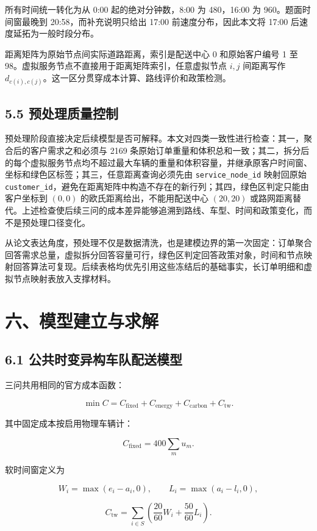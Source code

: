 \documentclass[UTF8,zihao=-4,a4paper]{ctexart}
\begin{document}
所有时间统一转化为从 0:00 起的绝对分钟数，8:00 为 480，16:00 为 960。题面时间窗最晚到 20:58，而补充说明只给出 17:00 前速度分布，因此本文将 17:00 后速度延拓为一般时段分布。

距离矩阵为原始节点间实际道路距离，索引是配送中心 0 和原始客户编号 1 至 98。虚拟服务节点不直接用于距离矩阵索引，任意虚拟节点 \(i,j\) 间距离写作 \(d_{c(i),c(j)}\)。这一区分贯穿成本计算、路线评价和政策检测。

\subsection{5.5 预处理质量控制}

预处理阶段直接决定后续模型是否可解释。本文对四类一致性进行检查：其一，聚合后的客户需求之和必须与 2169 条原始订单重量和体积总和一致；其二，拆分后的每个虚拟服务节点均不超过最大车辆的重量和体积容量，并继承原客户时间窗、坐标和绿色区标签；其三，任意距离查询必须先由 \texttt{service\_node\_id} 映射回原始 \texttt{customer\_id}，避免在距离矩阵中构造不存在的新行列；其四，绿色区判定只能由客户坐标到 \((0,0)\) 的欧氏距离给出，不能用配送中心 \((20,20)\) 或路网距离替代。上述检查使后续三问的成本差异能够追溯到路线、车型、时间和政策变化，而不是预处理口径变化。

从论文表达角度，预处理不仅是数据清洗，也是建模边界的第一次固定：订单聚合回答需求总量，虚拟拆分回答容量可行，绿色区判定回答政策对象，时间和节点映射回答算法可复现。后续表格均优先引用这些冻结后的基础事实，长订单明细和虚拟节点映射表放入支撑材料。


\section{六、模型建立与求解}

\subsection{6.1 公共时变异构车队配送模型}

三问共用相同的官方成本函数：

\[
\min C=C_{\mathrm{fixed}}+C_{\mathrm{energy}}+C_{\mathrm{carbon}}+C_{\mathrm{tw}}.
\]

其中固定成本按启用物理车辆计：

\[
C_{\mathrm{fixed}}=400\sum_{m}u_m.
\]

软时间窗定义为

\[
W_i=\max(e_i-a_i,0),\qquad L_i=\max(a_i-l_i,0),
\]

\[
C_{\mathrm{tw}}=\sum_{i\in S}\left(\frac{20}{60}W_i+\frac{50}{60}L_i\right).
\]
\end{document}
